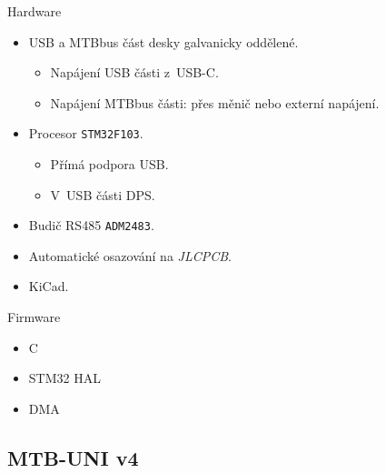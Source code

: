 \documentclass[aspectratio=169]{beamer}
\begin{document}

\begin{frame}{Hardware}
\begin{itemize}
\item USB a MTBbus část desky galvanicky oddělené.
\begin{itemize}
\item Napájení USB části z USB-C.
\item Napájení MTBbus části: přes měnič nebo externí napájení.
\end{itemize}
\item Procesor \texttt{STM32F103}.
\begin{itemize}
\item Přímá podpora USB.
\item V USB části DPS.
\end{itemize}
\item Budič RS485 \texttt{ADM2483}.
\item Automatické osazování na \textit{JLCPCB}.
\item KiCad.
\end{itemize}
\end{frame}


\begin{frame}{Firmware}
\begin{itemize}
\item C
\item STM32 HAL
\item DMA
\end{itemize}
\end{frame}


\subsection{MTB-UNI v4}
\end{document}
